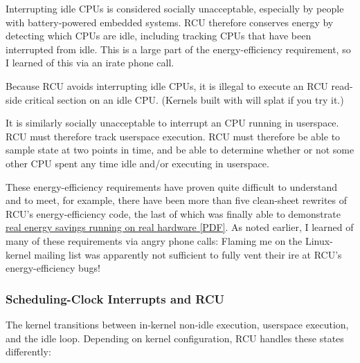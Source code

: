 Interrupting idle CPUs is considered socially unacceptable, especially
by people with battery-powered embedded systems.
RCU therefore conserves
energy by detecting which CPUs are idle, including tracking CPUs that
have been interrupted from idle.
This is a large part of the
energy-efficiency requirement, so I learned of this via an irate phone
call.

Because RCU avoids interrupting idle CPUs, it is illegal to execute an
RCU read-side critical section on an idle CPU.
(Kernels built with
 will splat if you try it.)

It is similarly socially unacceptable to interrupt an  CPU
running in userspace.
RCU must therefore track  userspace
execution.
RCU must therefore be able to sample state at two points in
time, and be able to determine whether or not some other CPU spent any
time idle and/or executing in userspace.

These energy-efficiency requirements have proven quite difficult to
understand and to meet, for example, there have been more than five
clean-sheet rewrites of RCU's energy-efficiency code, the last of which
was finally able to demonstrate
\href{http://www.rdrop.com/users/paulmck/realtime/paper/AMPenergy.2013.04.19a.pdf}{real energy savings running on real hardware [PDF]}.
As noted earlier, I learned of many of these requirements via angry
phone calls:
Flaming me on the Linux-kernel mailing list was apparently
not sufficient to fully vent their ire at RCU's energy-efficiency bugs!


\subsubsection{Scheduling-Clock Interrupts and RCU}

The kernel transitions between in-kernel non-idle execution, userspace
execution, and the idle loop.
Depending on kernel configuration, RCU
handles these states differently:


